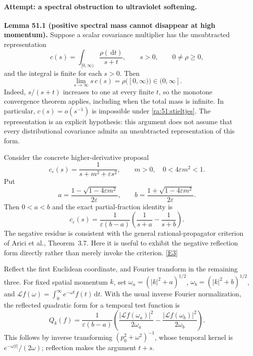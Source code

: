 \documentclass[11pt]{article}
\newcommand{\dd}{\,\mathrm d}
\newcommand{\eref}[2]{\hyperlink{extra:#1:#2}{[E#2]}}
\begin{document}
\paragraph{Attempt: a spectral obstruction to ultraviolet softening.}
\textbf{Lemma 51.1 (positive spectral mass cannot disappear at high
momentum).} Suppose a scalar covariance multiplier has the unsubtracted
representation
\begin{equation}\label{ra:51:stieltjes}
 c(s)=\int_{[0,\infty)}\frac{\rho(\dd t)}{s+t},\qquad s>0,
 \qquad 0\ne\rho\ge0,
\end{equation}
and the integral is finite for each $s>0$. Then
\[
 \lim_{s\to\infty}s\,c(s)=\rho([0,\infty))\in(0,\infty].
\]
Indeed, $s/(s+t)$ increases to one at every finite $t$, so the monotone
convergence theorem applies, including when the total mass is infinite.
In particular, $c(s)=o(s^{-1})$ is impossible under
\eqref{ra:51:stieltjes}. The representation is an explicit hypothesis:
this argument does not assume that every distributional covariance admits
an unsubtracted representation of this form.

Consider the concrete higher-derivative proposal
\[
 c_\varepsilon(s)=\frac{1}{s+m^2+\varepsilon s^2},\qquad
 m>0,\quad 0<4\varepsilon m^2<1.
\]
Put
\[
 a=\frac{1-\sqrt{1-4\varepsilon m^2}}{2\varepsilon},\qquad
 b=\frac{1+\sqrt{1-4\varepsilon m^2}}{2\varepsilon}.
\]
Then $0<a<b$ and the exact partial-fraction identity is
\begin{equation}\label{ra:51:ghost}
 c_\varepsilon(s)=\frac{1}{\varepsilon(b-a)}
 \left(\frac{1}{s+a}-\frac{1}{s+b}\right).
\end{equation}
The negative residue is consistent with the general rational-propagator
criterion of Arici et al., Theorem~3.7. Here it is useful to exhibit the
negative reflection form directly rather than merely invoke the criterion.
\eref{51}{3}

Reflect the first Euclidean coordinate, and Fourier transform in the
remaining three. For fixed spatial momentum $k$, set
$\omega_a=(|k|^2+a)^{1/2}$, $\omega_b=(|k|^2+b)^{1/2}$, and
$\mathcal Lf(\omega)=\int_0^\infty e^{-\omega t}f(t)\dd t$.
With the usual inverse Fourier normalization, the reflected quadratic form
for a temporal test function is
\begin{equation}\label{ra:51:reflection}
 Q_k(f)=\frac{1}{\varepsilon(b-a)}
 \left(\frac{|\mathcal Lf(\omega_a)|^2}{2\omega_a}
       -\frac{|\mathcal Lf(\omega_b)|^2}{2\omega_b}\right).
\end{equation}
This follows by inverse transforming $(p_0^2+\omega^2)^{-1}$, whose temporal
kernel is $e^{-\omega|t|}/(2\omega)$; reflection makes the argument $t+s$.
\end{document}
